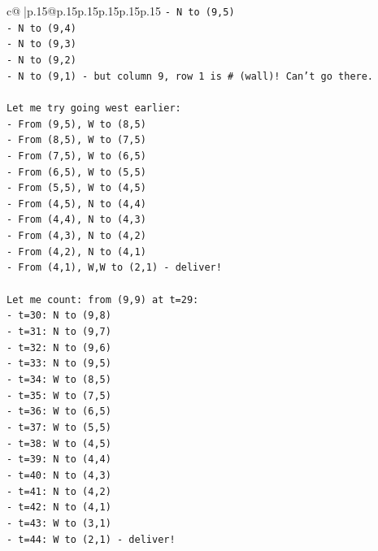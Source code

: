 \documentclass{article}
\begin{document}
{\begin{supertabular}{c@{$\;$}|p{.15\linewidth}@{}p{.15\linewidth}p{.15\linewidth}p{.15\linewidth}p{.15\linewidth}p{.15\linewidth}}
{{{\texttt{{-} N to (9,5)} \\
\texttt{{-} N to (9,4)} \\
\texttt{{-} N to (9,3)} \\
\texttt{{-} N to (9,2)} \\
\texttt{{-} N to (9,1) {-} but column 9, row 1 is \# (wall)! Can't go there.} \\
\\ 
\texttt{Let me try going west earlier:} \\
\texttt{{-} From (9,5), W to (8,5)} \\
\texttt{{-} From (8,5), W to (7,5)} \\
\texttt{{-} From (7,5), W to (6,5)} \\
\texttt{{-} From (6,5), W to (5,5)} \\
\texttt{{-} From (5,5), W to (4,5)} \\
\texttt{{-} From (4,5), N to (4,4)} \\
\texttt{{-} From (4,4), N to (4,3)} \\
\texttt{{-} From (4,3), N to (4,2)} \\
\texttt{{-} From (4,2), N to (4,1)} \\
\texttt{{-} From (4,1), W,W to (2,1) {-} deliver!} \\
\\ 
\texttt{Let me count: from (9,9) at t=29:} \\
\texttt{{-} t=30: N to (9,8)} \\
\texttt{{-} t=31: N to (9,7)} \\
\texttt{{-} t=32: N to (9,6)} \\
\texttt{{-} t=33: N to (9,5)} \\
\texttt{{-} t=34: W to (8,5)} \\
\texttt{{-} t=35: W to (7,5)} \\
\texttt{{-} t=36: W to (6,5)} \\
\texttt{{-} t=37: W to (5,5)} \\
\texttt{{-} t=38: W to (4,5)} \\
\texttt{{-} t=39: N to (4,4)} \\
\texttt{{-} t=40: N to (4,3)} \\
\texttt{{-} t=41: N to (4,2)} \\
\texttt{{-} t=42: N to (4,1)} \\
\texttt{{-} t=43: W to (3,1)} \\
\texttt{{-} t=44: W to (2,1) {-} deliver!} \\
\\ 
}}}
\end{supertabular}}
\end{document}
